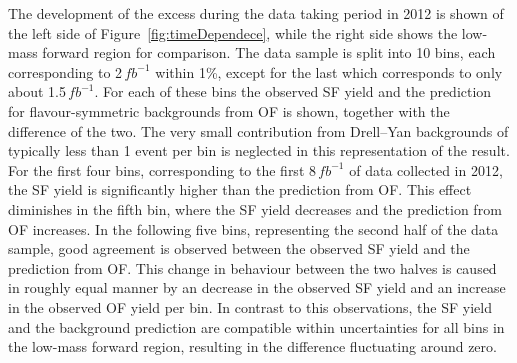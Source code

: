 The development of the excess during the data taking period in 2012 is shown of the left side of Figure~\ref{fig:timeDependece}, while the right side shows the low-mass forward region for comparison. The data sample is split into 10 bins, each corresponding to 2\,$fb^{-1}$ within 1\%, except for the last which corresponds to only  about 1.5\,$fb^{-1}$. For each of these bins the observed SF yield and the prediction for flavour-symmetric backgrounds from OF is shown, together with the difference of the two. The very small contribution from Drell--Yan backgrounds of typically less than 1 event per bin is neglected in this representation of the result. For the first four bins, corresponding to the first 8\,$fb^{-1}$ of data collected in 2012, the SF yield is significantly higher than the prediction from OF. This effect diminishes in the fifth bin, where the SF yield decreases and the prediction from OF increases. In the following five bins, representing the second half of the data sample, good agreement is observed between the observed SF yield and the prediction from OF. This change in behaviour between the two halves is caused in roughly equal manner by an decrease in the observed SF yield and an increase in the observed OF yield per bin. In contrast to this observations, the SF yield and the background prediction are compatible within uncertainties for all bins in the low-mass forward region, resulting in the difference fluctuating around zero. 

